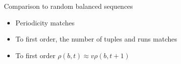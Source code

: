 \begin{frame}{Comparison to random balanced sequences}

  \begin{itemize}
  \item Periodicity matches
  \item To first order, the number of tuples and runs matches
  \item To first order $\rho(b,t) \approx v \rho(b,t+1)$
  \end{itemize}
  
  
\end{frame}

\begin{frame}{}

  
\end{frame}

\begin{frame}{}

  
\end{frame}





